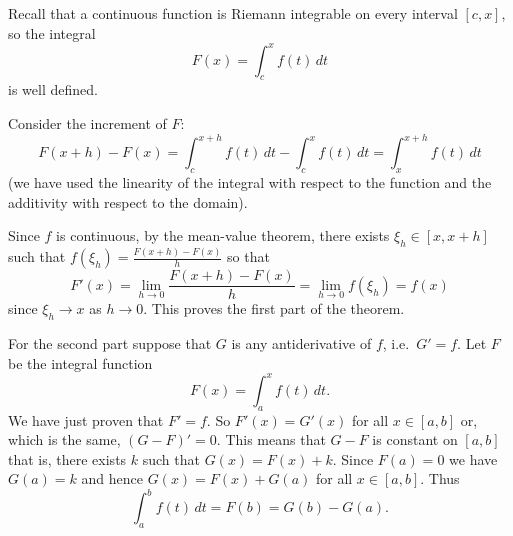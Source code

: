 \documentclass[12pt]{article}
\begin{document}
%
%

Recall that a continuous function is Riemann integrable on every interval $[c,x]$, so the integral
\[
  F(x) = \int_c^x f(t)\, dt
\]
is well defined.

Consider the increment of $F$:
\[
   F(x+h)-F(x) = \int_c^{x+h} f(t)\, dt - \int_c^x f(t)\, dt
  = \int_x^{x+h} f(t)\, dt
\] 
(we have used the linearity of the integral with respect to the function and the additivity with respect to the domain).

Since $f$ is continuous, by the mean-value theorem, there exists $\xi_h\in [x,x+h]$ such that $f(\xi_h) = \frac{F(x+h)-F(x)}{h}$ so that
\[
  F'(x)= \lim_{h\to 0} \frac{ F(x+h)-F(x)}{h} = \lim_{h\to 0} f(\xi_h) = f(x)
\]
since $\xi_h\to x$ as $h\to 0$.
This proves the first part of the theorem.

For the second part suppose that $G$ is any antiderivative of $f$, i.e.\ $G'=f$.
Let $F$ be the integral function
\[
  F(x)= \int_a^x f(t) \, dt.
\]
We have just proven that $F'=f$. So $F'(x)=G'(x)$ for all $x\in [a,b]$ or, which is the same, $(G-F)'=0$. This means that $G-F$ is 
constant on $[a,b]$ that is, there exists $k$ such that $G(x)=F(x)+k$. Since $F(a)=0$ we have $G(a)=k$ and hence $G(x)=F(x)+G(a)$ for all $x\in[a,b]$.
Thus
\[
  \int_a^b f(t)\, dt = F(b) = G(b) - G(a).
\]
\end{document}
